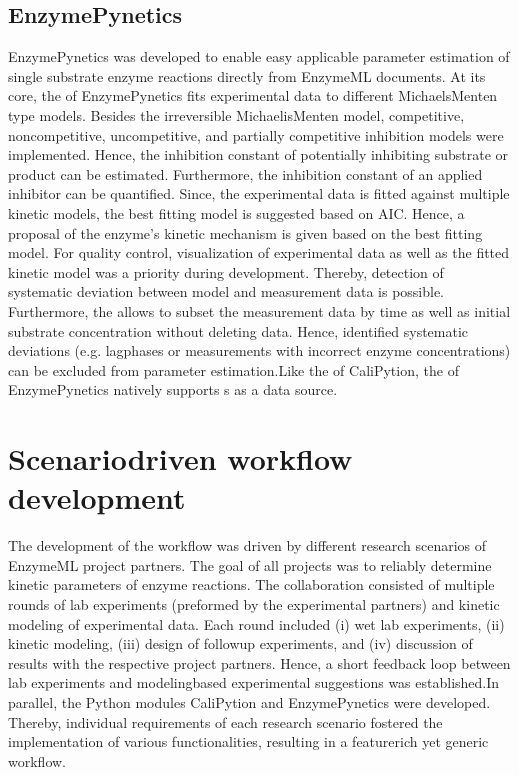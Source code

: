 \documentclass[letterpaper,12pt,english]{jupyterBook}
\begin{document}
\subsection{EnzymePynetics}
\label{\detokenize{results:enzymepynetics}}
\sphinxAtStartPar
EnzymePynetics was developed to enable easy applicable parameter estimation of single substrate enzyme reactions directly from EnzymeML documents. At its core, the  of EnzymePynetics fits experimental data to different Michaels\sphinxhyphen{}Menten type models. Besides the irreversible Michaelis\sphinxhyphen{}Menten model, competitive, non\sphinxhyphen{}competitive, uncompetitive, and partially competitive inhibition models were implemented. Hence, the inhibition constant of potentially inhibiting substrate or product can be estimated. Furthermore, the inhibition constant of an applied inhibitor can be quantified. Since, the experimental data is fitted against multiple kinetic models, the best fitting model is suggested based on AIC. Hence, a proposal of the enzyme’s kinetic mechanism is given based on the best fitting model.
For quality control, visualization of experimental data as well as the fitted kinetic model was a priority during development. Thereby, detection of systematic deviation between model and measurement data is possible. Furthermore, the  allows to subset the measurement data by time as well as initial substrate concentration without deleting data. Hence, identified systematic deviations (e.g. lag\sphinxhyphen{}phases or measurements with incorrect enzyme concentrations) can be excluded from parameter estimation.Like the  of CaliPytion, the  of EnzymePynetics natively supports s as a data source.


\section{Scenario\sphinxhyphen{}driven workflow development}
\label{\detokenize{results:scenario-driven-workflow-development}}
\sphinxAtStartPar
The development of the workflow was driven by different research scenarios of EnzymeML project partners. The goal of all projects was to reliably determine kinetic parameters of enzyme reactions.
The collaboration consisted of multiple rounds of lab experiments (preformed by the experimental partners) and kinetic modeling of experimental data. Each round included (i) wet lab experiments, (ii) kinetic modeling, (iii) design of follow\sphinxhyphen{}up experiments, and (iv) discussion of results with the respective project partners. Hence, a short feedback loop between lab experiments and modeling\sphinxhyphen{}based experimental suggestions was established.In parallel, the Python modules CaliPytion and EnzymePynetics were developed. Thereby, individual requirements of each research scenario fostered the implementation of various functionalities, resulting in a feature\sphinxhyphen{}rich yet generic workflow.
\end{document}
